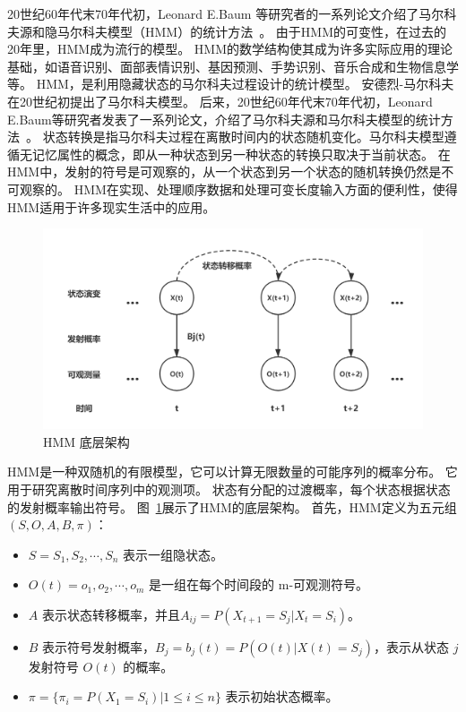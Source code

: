 \documentclass[degree=project, degree-type=project]{thuthesis}
\begin{document}
20世纪60年代末70年代初，Leonard E.Baum 等研究者的一系列论文介绍了马尔科夫源和隐马尔科夫模型（HMM）的统计方法~\cite{HMM}。
由于HMM的可变性，在过去的20年里，HMM成为流行的模型。
HMM的数学结构使其成为许多实际应用的理论基础，如语音识别、面部表情识别、基因预测、手势识别、音乐合成和生物信息学等。
HMM，是利用隐藏状态的马尔科夫过程设计的统计模型。
安德烈-马尔科夫在20世纪初提出了马尔科夫模型。
后来，20世纪60年代末70年代初，Leonard E.Baum等研究者发表了一系列论文，介绍了马尔科夫源和马尔科夫模型的统计方法~\cite{HMM}。
状态转换是指马尔科夫过程在离散时间内的状态随机变化。马尔科夫模型遵循无记忆属性的概念，即从一种状态到另一种状态的转换只取决于当前状态。
在HMM中，发射的符号是可观察的，从一个状态到另一个状态的随机转换仍然是不可观察的。
HMM在实现、处理顺序数据和处理可变长度输入方面的便利性，使得HMM适用于许多现实生活中的应用。

\begin{figure}[!htp]
	\centering
	\includegraphics[width=0.8\columnwidth]{HMM.png}
	\caption{HMM 底层架构}
	\label{fig:HMM}
\end{figure}

HMM是一种双随机的有限模型，它可以计算无限数量的可能序列的概率分布。
它用于研究离散时间序列中的观测项。
状态有分配的过渡概率，每个状态根据状态的发射概率输出符号。
图~\ref{fig:HMM}展示了HMM的底层架构。
首先，HMM定义为五元组 $(S, O, A, B, \pi)$：
\begin{itemize}
	\item $S = S_1, S_2, \cdots, S_n$ 表示一组隐状态。
	\item $O(t) = o_1, o_2, \cdots, o_m$ 是一组在每个时间段的 m-可观测符号。
	\item $A$ 表示状态转移概率，并且$A_{ij} = P(X_{t+1} = S_j | X_t = S_i)$。
	\item $B$ 表示符号发射概率，$B_j = b_j(t) = P(O(t)|X(t) = S_j)$，表示从状态 $j$ 发射符号 $O(t)$ 的概率。
	\item $\pi = \{\pi_i = P(X_1 = S_i)| 1 \le i \le n\}$ 表示初始状态概率。
\end{itemize}
\end{document}
